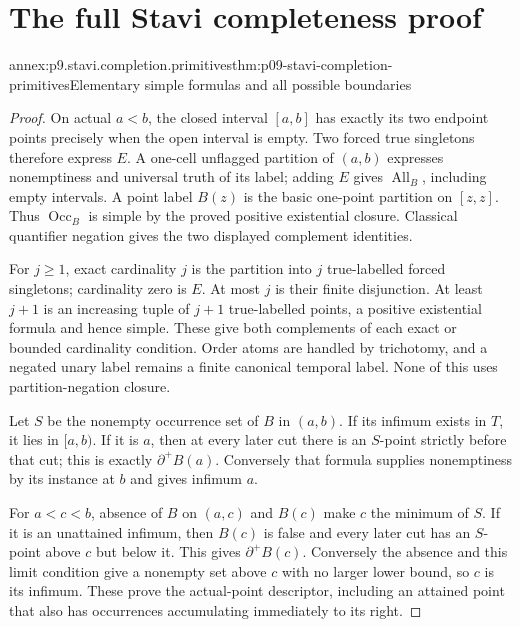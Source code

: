 
\section{The full Stavi completeness proof}
\label{sec:annex-p09-stavi-completeness}

\begin{annexitem}{annex:p9.stavi.completion.primitives}{thm:p09-stavi-completion-primitives}{Elementary simple formulas and all possible boundaries}
\begin{proof}
On actual \(a<b\), the closed interval \([a,b]\)
has exactly its two endpoint points precisely
when the open interval is empty. Two forced
true singletons therefore express \(E\).
A one-cell unflagged partition of \((a,b)\)
expresses nonemptiness and universal truth of
its label; adding \(E\) gives
\(\operatorname{All}_B\), including empty
intervals. A point label \(B(z)\) is the
basic one-point partition on \([z,z]\).
Thus \(\operatorname{Occ}_B\) is simple
by the proved positive existential closure.
Classical quantifier negation gives the
two displayed complement identities.

For \(j\geq1\), exact cardinality \(j\)
is the partition into \(j\) true-labelled
forced singletons; cardinality zero is
\(E\). At most \(j\) is their finite
disjunction. At least \(j+1\) is an
increasing tuple of \(j+1\) true-labelled
points, a positive existential formula
and hence simple. These give both
complements of each exact or bounded
cardinality condition. Order atoms
are handled by trichotomy, and a
negated unary label remains a
finite canonical temporal label.
None of this uses partition-negation
closure.

Let \(S\) be the nonempty occurrence
set of \(B\) in \((a,b)\). If its
infimum exists in \(T\), it lies
in \([a,b)\). If it is \(a\),
then at every later cut there is
an \(S\)-point strictly before
that cut; this is exactly
\(\partial^+B(a)\). Conversely
that formula supplies nonemptiness
by its instance at \(b\) and
gives infimum \(a\).

For \(a<c<b\), absence of \(B\)
on \((a,c)\) and \(B(c)\)
make \(c\) the minimum of \(S\).
If it is an unattained infimum,
then \(B(c)\) is false and
every later cut has an \(S\)-point
above \(c\) but below it.
This gives \(\partial^+B(c)\).
Conversely the absence and
this limit condition give a
nonempty set above \(c\)
with no larger lower bound,
so \(c\) is its infimum.
These prove the actual-point
descriptor, including an
attained point that also
has occurrences accumulating
immediately to its right.


\end{proof}
\end{annexitem}
